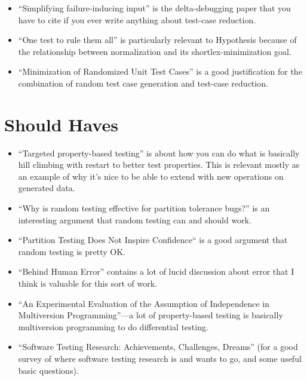 \begin{itemize}
\item ``Simplifying failure-inducing input''\cite{DBLP:conf/issta/HildebrandtZ00} is the delta-debugging paper that you have to cite if you ever write anything about test-case reduction.
\item ``One test to rule them all''\cite{DBLP:conf/issta/GroceHK17} is particularly relevant to Hypothesis because of the relationship between normalization and its shortlex-minimization goal.
\item ``Minimization of Randomized Unit Test Cases''\cite{DBLP:conf/issre/LeiA05} is a good justification for the combination of random test case generation and test-case reduction.
\end{itemize}

\section{Should Haves}

\begin{itemize}
\item ``Targeted property-based testing''\cite{DBLP:conf/issta/LoscherS17} is about how you can do what is basically hill climbing with restart to better test properties.
This is relevant mostly as an example of why it's nice to be able to extend with new operations on generated data.
\item ``Why is random testing effective for partition tolerance bugs?''\cite{DBLP:journals/pacmpl/MajumdarN18} is an interesting argument that random testing can and should work.
\item ``Partition Testing Does Not Inspire Confidence``\cite{DBLP:journals/tse/HamletT90} is a good argument that random testing is pretty OK.
\item ``Behind Human Error''\cite{BehindHumanError} contains a lot of lucid discussion about error that I think is valuable for this sort of work.
\item ``An Experimental Evaluation of the Assumption of Independence in Multiversion Programming''\cite{DBLP:journals/tse/KnightL86}---a
lot of property-based testing is basically multiversion programming to do differential testing.
\item ``Software Testing Research: Achievements, Challenges, Dreams''\cite{DBLP:conf/icse/Bertolino07} (for a good survey of where software testing research is and wants to go, and some useful basic questions).
\end{itemize}

